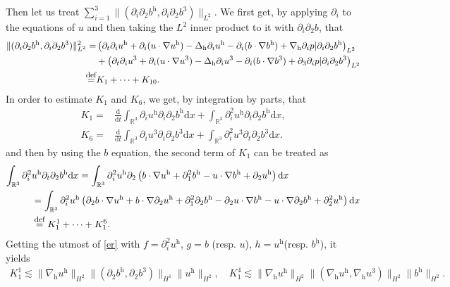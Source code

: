 \documentclass[11pt]{amsart}
\theoremstyle{definition}
\newcommand{\R}{\mathbb{R}}
\newcommand{\h}{\mathrm{h}}
\def\eqdefa{\buildrel\hbox{\footnotesize def}\over =}
\newcommand{\nablah}{\nabla_{\mathrm{h}}}
\numberwithin{equation}{section}
\begin{document}
Then let us treat $\sum_{i=1}^3\|(\partial_i\partial_2b^\h,\partial_i\partial_2b^3)\|_{L^2}$. We first get, by applying $\partial_{i}$ to the equations of  $u$ and then taking the $L^2$ inner product to it with $\partial_{i}\partial_{2}b$, that
\begin{align}\label{p2b_enH1}
	\|(\partial_i\partial_2b^\h,\partial_i\partial_2b^3)\|_{L^2}^2=&\left(\partial_{t}\partial_{i}u^\h+\partial_{i}(u\cdot \nabla u^\h)-\Delta_{\mathrm{h}}\partial_{i}u^\h-\partial_{i}(b\cdot \nabla b^\h)+\nablah\partial_{i}p|\partial_{i}\partial_{2}b^\h\right)_{L^2}\nonumber\\
	&+\left(\partial_{t}\partial_{i}u^3+\partial_{i}(u\cdot \nabla u^3)-\Delta_{\mathrm{h}}\partial_{i}u^3-\partial_{i}(b\cdot \nabla b^3)+\partial_{3}\partial_{i}p|\partial_{i}\partial_{2}b^3\right)_{L^2}\nonumber\\\eqdefa &K_{1}+\cdots+K_{10}.
\end{align}
In order to estimate $K_{1}$ and $K_{6}$, we get, by integration by parts, that
\begin{align*}
	K_{1}=&\frac{\mathrm{d}}{\mathrm{d}t}\int_{\R^3}\partial_{i}u^\h\partial_{i}\partial_{2}b^\h\mathrm{d}x+\int_{\R^3}\partial_{i}^2u^\h\partial_{t}\partial_{2}b^\h\mathrm{d}x,\\
	K_{6}=&\frac{\mathrm{d}}{\mathrm{d}t}\int_{\R^3}\partial_{i}u^3\partial_{i}\partial_{2}b^3\mathrm{d}x+\int_{\R^3}\partial_{i}^2u^3\partial_{t}\partial_{2}b^3\mathrm{d}x.
\end{align*}
and then by using the $b$ equation, the second term of $K_1$ can be treated as
\begin{align*}
	\int_{\R^3}\partial_{i}^2&u^\h\partial_{t}\partial_{2}b^\h\mathrm{d}x=\int_{\R^3} \partial_{i}^2u^\h\partial_{2}\left(b\cdot\nabla u^\h+\partial^{2}_{1}b^\h-u\cdot\nabla b^\h+\partial_{2}u^\h\right)\mathrm{d}x\\&=
	\int_{\R^3} \partial_{i}^2u^\h\left(\partial_{2}b\cdot\nabla u^\h+b\cdot\nabla \partial_{2}u^\h+\partial^{2}_{1}\partial_{2}b^\h-\partial_{2}u\cdot\nabla  b^\h-u \cdot\nabla  \partial_{2}b^\h+\partial_{2}^2u^\h\right)\mathrm{d}x
	\\&\eqdefa K^{1}_{1}+\cdots+ K^{6}_{1}.
\end{align*}
Getting the utmost of \eqref{er} with $f=\partial_{i}^2 u^\h$, $g=b$ (resp. $u$), $h=u^\h$(resp. $b^\h$), it yields
\begin{align*}
	K^{1}_{1}\lesssim\|\nabla_{\mathrm{h}}u^\h\|_{H^{2}}\|(\partial_2b^\mathrm{h},\partial_2b^3)\|_{H^{1}}\|u^\h\|_{H^{2}},\quad  K^{4}_{1}\lesssim\|\nabla_{\mathrm{h}}u^\h\|_{H^{2}}\|(\nabla_{\mathrm{h}}u^\h,\nabla_{\mathrm{h}}u^3)\|_{H^{2}}\|b^\h\|_{H^{2}}.
\end{align*}
\end{document}
